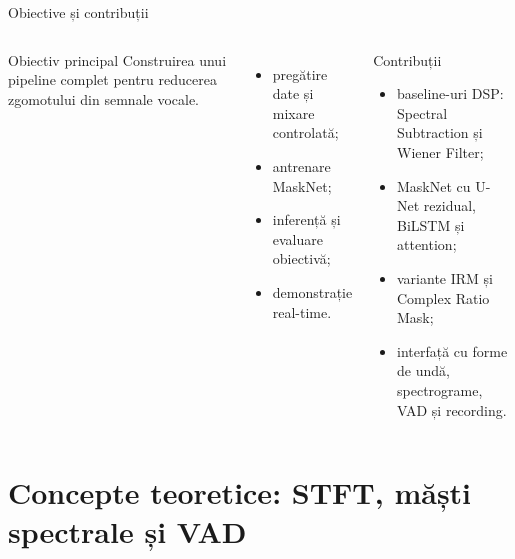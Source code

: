 \documentclass[aspectratio=169,11pt]{beamer}
\begin{document}
\begin{frame}{Obiective și contribuții}
  \begin{columns}[T,onlytextwidth]
      \begin{block}{Obiectiv principal}
        Construirea unui pipeline complet pentru reducerea zgomotului din semnale vocale.
      \end{block}
      \begin{itemize}
        \item pregătire date și mixare controlată;
        \item antrenare MaskNet;
        \item inferență și evaluare obiectivă;
        \item demonstrație real-time.
      \end{itemize}

      \begin{block}{Contribuții}
        \begin{itemize}
          \item baseline-uri DSP: Spectral Subtraction și Wiener Filter;
          \item MaskNet cu U-Net rezidual, BiLSTM și attention;
          \item variante IRM și Complex Ratio Mask;
          \item interfață cu forme de undă, spectrograme, VAD și recording.
        \end{itemize}
      \end{block}
  \end{columns}
\end{frame}

\section{Concepte teoretice: STFT, măști spectrale și VAD}
\end{document}
